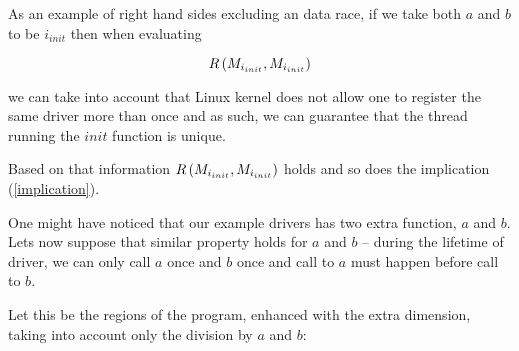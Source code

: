 \documentclass[..thesis.tex]{subfiles}
\begin{document}
As an example of right hand sides excluding an data race, if we take both $a$ and $b$ to be $i_{init}$ then when evaluating 

\begin{equation*}
R \left( M_{i_{init}}, M_{i_{init}} \right)
\end{equation*} 

we can take into account that Linux kernel does not allow one to register the same driver more than once and as such, we can guarantee that the thread running the $init$ function is unique.

Based on that information $R \left( M_{i_{init}}, M_{i_{init}} \right)$ holds and so does the implication (\ref{implication}).



One might have noticed that our example drivers has two extra function, $a$ and $b$. Lets now suppose that similar property holds for $a$ and $b$ -- during the lifetime of driver, we can only call $a$ once and $b$ once and call to $a$  must happen before call to $b$.

Let this be the regions of the program, enhanced with the extra dimension, taking into account only the division by $a$ and $b$:



\end{document}
